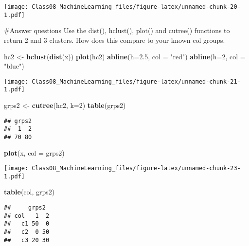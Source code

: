 \documentclass[]{article}
\newenvironment{Shaded}{\begin{snugshade}}{\end{snugshade}}
\newcommand{\DataTypeTok}[1]{\textcolor[rgb]{0.13,0.29,0.53}{#1}}
\newcommand{\DecValTok}[1]{\textcolor[rgb]{0.00,0.00,0.81}{#1}}
\newcommand{\FloatTok}[1]{\textcolor[rgb]{0.00,0.00,0.81}{#1}}
\newcommand{\KeywordTok}[1]{\textcolor[rgb]{0.13,0.29,0.53}{\textbf{#1}}}
\newcommand{\NormalTok}[1]{#1}
\newcommand{\StringTok}[1]{\textcolor[rgb]{0.31,0.60,0.02}{#1}}
\begin{document}
\texttt{[image: Class08\_MachineLearning\_files/figure-latex/unnamed-chunk-20-1.pdf]}

\#Answer questions Use the dist(), hclust(), plot() and cutree()
functions to return 2 and 3 clusters. How does this compare to your
known col groups.

\begin{Shaded}
\begin{Highlighting}[]
\NormalTok{hc2 <-}\StringTok{ }\KeywordTok{hclust}\NormalTok{(}\KeywordTok{dist}\NormalTok{(x))}
\KeywordTok{plot}\NormalTok{(hc2)}
\KeywordTok{abline}\NormalTok{(}\DataTypeTok{h=}\FloatTok{2.5}\NormalTok{, }\DataTypeTok{col =} \StringTok{"red"}\NormalTok{)}
\KeywordTok{abline}\NormalTok{(}\DataTypeTok{h=}\DecValTok{2}\NormalTok{, }\DataTypeTok{col =} \StringTok{"blue"}\NormalTok{)}
\end{Highlighting}
\end{Shaded}

\texttt{[image: Class08\_MachineLearning\_files/figure-latex/unnamed-chunk-21-1.pdf]}

\begin{Shaded}
\begin{Highlighting}[]
\NormalTok{grps2 <-}\StringTok{ }\KeywordTok{cutree}\NormalTok{(hc2, }\DataTypeTok{k=}\DecValTok{2}\NormalTok{)}
\KeywordTok{table}\NormalTok{(grps2)}
\end{Highlighting}
\end{Shaded}

\begin{verbatim}
## grps2
##  1  2 
## 70 80
\end{verbatim}

\begin{Shaded}
\begin{Highlighting}[]
\KeywordTok{plot}\NormalTok{(x, }\DataTypeTok{col =}\NormalTok{ grps2)}
\end{Highlighting}
\end{Shaded}

\texttt{[image: Class08\_MachineLearning\_files/figure-latex/unnamed-chunk-23-1.pdf]}

\begin{Shaded}
\begin{Highlighting}[]
\KeywordTok{table}\NormalTok{(col, grps2)}
\end{Highlighting}
\end{Shaded}

\begin{verbatim}
##     grps2
## col   1  2
##   c1 50  0
##   c2  0 50
##   c3 20 30
\end{verbatim}
\end{document}
